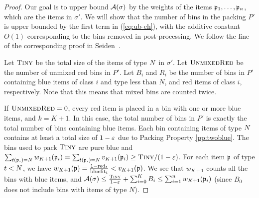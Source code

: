 \begin{proof}
	Our goal is to upper bound $\mathcal{A}(\sigma)$ by the weights of the items $\mathfrak{p}_1,\dots,\mathfrak{p}_n$, which
	are the items in $\sigma'$. 
	We will show that the number of bins in the packing $P'$ is upper bounded by the first term in 
	(\ref{eq:ub-eh}), with the additive constant $O(1)$ corresponding to the bins removed in post-processing.
	We follow the line of the corresponding proof in Seiden~\cite{Seiden02}.
	
	Let $\textsc{Tiny}$ be the total size of the items of type $N$ in $\sigma'$.
	Let $\textsc{UnmixedRed}$ be the number of unmixed red bins in $P'$.
	Let $B_i$ and $R_i$ be the number of bins in $P'$
	containing blue items of class $i$ and type less than $N$, and red items of class $i$, respectively. 
	Note that this means that mixed bins are counted twice.
	
	If $\textsc{UnmixedRed} = 0$, every red item is placed in a bin with one or more blue items, and $k=K+1$. In this case,
	the total number of bins in $P'$ is exactly the total number of bins containing blue items.
	Each bin containing items of type $N$ contains at least a total size of $1-\varepsilon$
	due to Packing Property \ref{pp:twoblue}.
	The bins used to pack $\textsc{Tiny}$ are pure blue and $\sum_{t(\mathfrak{p}_i)=N} w_{K+1}(\mathfrak{p}_i)=
	\sum_{t(\mathfrak{p}_i)=N} v_{K+1}(\mathfrak{p}_i) \ge  
	\textsc{Tiny}/(1-\varepsilon)$. 
For each item $\mathfrak{p}$ 	of type $t<N$, we have
	$w_{K+1}(\mathfrak{p}) = \frac{1-\mathrm{red}_t}{\mathrm{bluefit}_t} < v_{K+1}(\mathfrak{p})$. We see that $w_{K+1}$ counts all the bins with blue items, and
	$	\mathcal{A}(\sigma)\le \frac{\textsc{Tiny}}{1-\varepsilon} + \sum_{i=0}^K B_i\le \sum_{i=1}^n w_{K+1}(\mathfrak{p}_i)$
	(since $B_0$ does not include bins with items of type $N$).





\end{proof}

